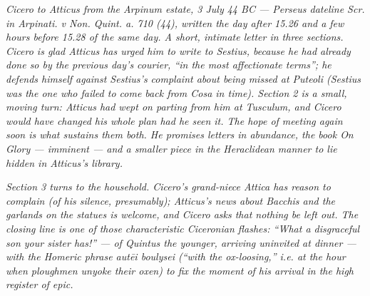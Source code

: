 
\textit{Cicero to Atticus from the Arpinum estate, 3 July 44 BC
--- Perseus dateline \textit{Scr. in Arpinati. v Non. Quint. a.
710 (44)}, written the day after 15.26 and a few hours before
15.28 of the same day. A short, intimate letter in three sections.
Cicero is glad Atticus has urged him to write to Sestius, because
he had already done so by the previous day's courier, ``in the
most affectionate terms''; he defends himself against Sestius's
complaint about being missed at Puteoli (Sestius was the one who
failed to come back from Cosa in time). Section 2 is a small,
moving turn: Atticus had wept on parting from him at Tusculum, and
Cicero would have changed his whole plan had he seen it. The
hope of meeting again soon is what sustains them both. He
promises letters in abundance, the book \textit{On Glory} ---
imminent --- and a smaller piece in the Heraclidean manner to lie
hidden in Atticus's library.}

\textit{Section 3 turns to the household. Cicero's grand-niece
Attica has reason to complain (of his silence, presumably);
Atticus's news about Bacchis and the garlands on the statues is
welcome, and Cicero asks that nothing be left out. The closing
line is one of those characteristic Ciceronian flashes: ``What a
disgraceful son your sister has!'' --- of Quintus the younger,
arriving uninvited at dinner --- with the Homeric phrase
\textit{aut\=ei boulysei} (``with the ox-loosing,'' i.e. at the
hour when ploughmen unyoke their oxen) to fix the moment of his
arrival in the high register of epic.}
